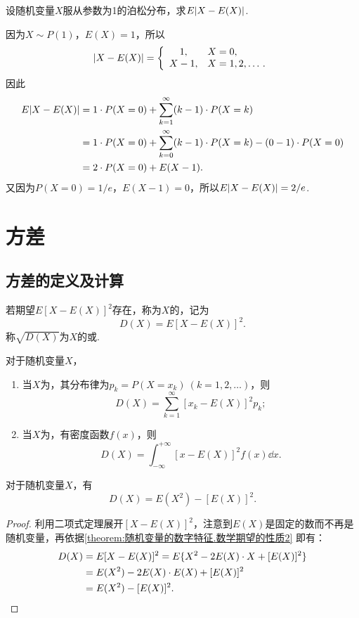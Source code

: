 \begin{example}
设随机变量\(X\)服从参数为1的泊松分布，求\(E\abs{X-E(X)}\).
\begin{solution}
因为\(X \sim P(1)\)，\(E(X) = 1\)，所以\[
\abs{X-E(X)} = \left\{ \begin{array}{cl}
1, & X=0, \\
X - 1, & X=1,2,\dotsc.
\end{array} \right.
\]因此\begin{align*}
E\abs{X-E(X)}
&= 1 \cdot P(X=0)
+ \sum_{k=1}^\infty (k-1) \cdot P(X=k) \\
&= 1 \cdot P(X=0)
+ \sum_{k=0}^\infty (k-1) \cdot P(X=k)
- (0-1) \cdot P(X=0) \\
&= 2 \cdot P(X=0)
+ E(X-1).
\end{align*}
又因为\(P(X=0)=1/e\)，\(E(X-1) = 0\)，所以\(E\abs{X-E(X)} = 2/e\).
\end{solution}
\end{example}

\section{方差}
\subsection{方差的定义及计算}
\begin{definition}
若期望\(E[X-E(X)]^2\)存在，称为\(X\)的，记为\[
D(X) = E[X-E(X)]^2.
\]称\(\sqrt{D(X)}\)为\(X\)的或.
\end{definition}

\begin{theorem}
对于随机变量\(X\)，
\begin{enumerate}
\item 当\(X\)为，其分布律为\(p_k = P(X=x_k)\ (k=1,2,\dotsc)\)，则\[
D(X) = \sum_{k=1}^\infty [x_k - E(X)]^2 p_k;
\]
\item 当\(X\)为，有密度函数\(f(x)\)，则\[
D(X) = \int_{-\infty}^{+\infty} [x - E(X)]^2 f(x) \dd{x}.
\]
\end{enumerate}
\end{theorem}

\begin{corollary}\label{theorem:随机变量的数字特征.常用的方差的计算式}
对于随机变量\(X\)，有\begin{equation}
D(X) = E(X^2) - [E(X)]^2.
\end{equation}
\begin{proof}
利用二项式定理展开\([X-E(X)]^2\)，注意到\(E(X)\)是固定的数而不再是随机变量，再依据\cref{theorem:随机变量的数字特征.数学期望的性质2} 即有：
\begin{align*}
D(X) &= E[X-E(X)]^2
= E\{X^2 - 2E(X) \cdot X + [E(X)]^2\} \\
&= E(X^2) - 2E(X) \cdot E(X) + [E(X)]^2 \\
&= E(X^2) - [E(X)]^2.
\qedhere
\end{align*}
\end{proof}
\end{corollary}

